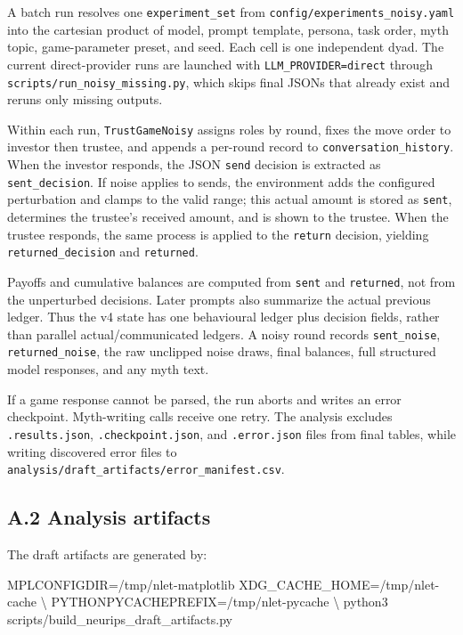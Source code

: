 \documentclass[10pt,letterpaper]{article}
\newenvironment{Shaded}{\begin{snugshade}}{\end{snugshade}}
\newcommand{\DataTypeTok}[1]{\textcolor[rgb]{0.68,0.00,0.00}{#1}}
\newcommand{\ExtensionTok}[1]{\textcolor[rgb]{0.00,0.23,0.31}{#1}}
\newcommand{\NormalTok}[1]{\textcolor[rgb]{0.00,0.23,0.31}{#1}}
\newcommand{\OperatorTok}[1]{\textcolor[rgb]{0.37,0.37,0.37}{#1}}
\newcommand{\VariableTok}[1]{\textcolor[rgb]{0.07,0.07,0.07}{#1}}
\begin{document}
A batch run resolves one \texttt{experiment\_set} from
\texttt{config/experiments\_noisy.yaml} into the cartesian product of
model, prompt template, persona, task order, myth topic, game-parameter
preset, and seed. Each cell is one independent dyad. The current
direct-provider runs are launched with \texttt{LLM\_PROVIDER=direct}
through \texttt{scripts/run\_noisy\_missing.py}, which skips final JSONs
that already exist and reruns only missing outputs.

Within each run, \texttt{TrustGameNoisy} assigns roles by round, fixes
the move order to investor then trustee, and appends a per-round record
to \texttt{conversation\_history}. When the investor responds, the JSON
\texttt{send} decision is extracted as \texttt{sent\_decision}. If noise
applies to sends, the environment adds the configured perturbation and
clamps to the valid range; this actual amount is stored as
\texttt{sent}, determines the trustee's received amount, and is shown to
the trustee. When the trustee responds, the same process is applied to
the \texttt{return} decision, yielding \texttt{returned\_decision} and
\texttt{returned}.

Payoffs and cumulative balances are computed from \texttt{sent} and
\texttt{returned}, not from the unperturbed decisions. Later prompts
also summarize the actual previous ledger. Thus the v4 state has one
behavioural ledger plus decision fields, rather than parallel
actual/communicated ledgers. A noisy round records \texttt{sent\_noise},
\texttt{returned\_noise}, the raw unclipped noise draws, final balances,
full structured model responses, and any myth text.

If a game response cannot be parsed, the run aborts and writes an error
checkpoint. Myth-writing calls receive one retry. The analysis excludes
\texttt{.results.json}, \texttt{.checkpoint.json}, and
\texttt{.error.json} files from final tables, while writing discovered
error files to \texttt{analysis/draft\_artifacts/error\_manifest.csv}.

\subsection{A.2 Analysis artifacts}\label{a.2-analysis-artifacts}

The draft artifacts are generated by:

\begin{Shaded}
\begin{Highlighting}[]
\VariableTok{MPLCONFIGDIR}\OperatorTok{=}\NormalTok{/tmp/nlet{-}matplotlib }\VariableTok{XDG\_CACHE\_HOME}\OperatorTok{=}\NormalTok{/tmp/nlet{-}cache }\DataTypeTok{\textbackslash{}}
\VariableTok{PYTHONPYCACHEPREFIX}\OperatorTok{=}\NormalTok{/tmp/nlet{-}pycache }\DataTypeTok{\textbackslash{}}
\ExtensionTok{python3}\NormalTok{ scripts/build\_neurips\_draft\_artifacts.py}
\end{Highlighting}
\end{Shaded}
\end{document}
